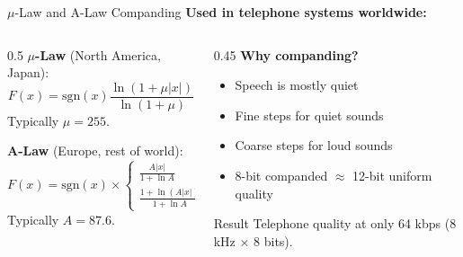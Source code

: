 \documentclass[aspectratio=169,12pt]{beamer}
\begin{document}
\begin{frame}{$\mu$-Law and A-Law Companding}
    \textbf{Used in telephone systems worldwide:}
    
    \vspace{0.3cm}
    \begin{columns}
        \begin{column}{0.5\textwidth}
            \textbf{$\mu$-Law} (North America, Japan):
            \[
                F(x) = \text{sgn}(x)\frac{\ln(1+\mu|x|)}{\ln(1+\mu)}
            \]
            Typically $\mu = 255$.
            
            \vspace{0.3cm}
            \textbf{A-Law} (Europe, rest of world):
            \[
                F(x) = \text{sgn}(x) \times
                \begin{cases}
                    \frac{A|x|}{1+\ln A} & |x| < \frac{1}{A} \\
                    \frac{1+\ln(A|x|)}{1+\ln A} & \text{else}
                \end{cases}
            \]
            Typically $A = 87.6$.
        \end{column}
        \begin{column}{0.45\textwidth}
            \textbf{Why companding?}
            \begin{itemize}
                \item Speech is mostly quiet
                \item Fine steps for quiet sounds
                \item Coarse steps for loud sounds
                \item 8-bit companded $\approx$ 12-bit uniform quality
            \end{itemize}
            
            \vspace{0.3cm}
            \begin{block}{Result}
                Telephone quality at only 64 kbps (8 kHz $\times$ 8 bits).
            \end{block}
        \end{column}
    \end{columns}
\end{frame}
\end{document}
